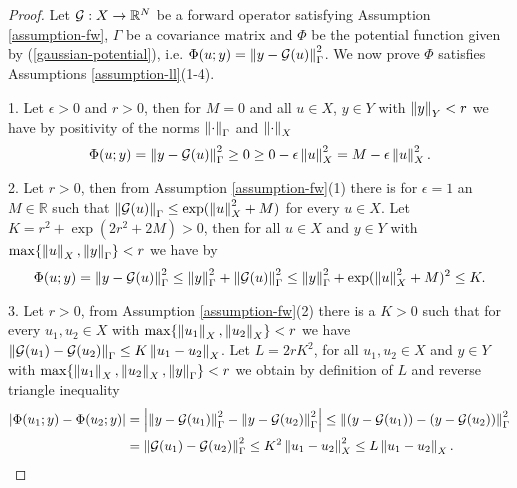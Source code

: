\begin{proof}
  Let $\mathcal{G} : X \rightarrow \mathbb{R}^N$ be a forward operator satisfying Assumption \ref{assumption-fw}, $\Gamma$ be a covariance matrix and $\Phi$ be the potential function given by (\ref{gaussian-potential}), i.e. $\Phi(u; y) = \left\lVert y - \mathcal{G}(u)\right\rVert_\Gamma^2$. We now prove $\Phi$ satisfies Assumptions \ref{assumption-ll}(1-4).

  1. Let $\epsilon > 0$ and $r > 0$, then for $M = 0$ and all $u \in X$, $y \in Y$ with $\left\lVert y\right\rVert_Y < r$ we have by positivity of the norms $\left\lVert\cdot\right\rVert_\Gamma$ and $\left\lVert\cdot\right\rVert_X$
  \begin{equation*}
    \Phi(u; y) = \left\lVert y - \mathcal{G}(u)\right\rVert_\Gamma^2 \ge 0 \ge 0 - \epsilon\left\lVert u\right\rVert_X^2 = M - \epsilon\left\lVert u\right\rVert_X^2.
  \end{equation*}

  2. Let $r > 0$, then from Assumption \ref{assumption-fw}(1) there is for $\epsilon = 1$ an $M \in \mathbb{R}$ such that $\left\lVert\mathcal{G}(u)\right\rVert_\Gamma \le \exp(\left\lVert u\right\rVert_X^2 + M)$ for every $u \in X$. Let $K = r^2 + \exp(2r^2 + 2M) > 0$, then for all $u \in X$ and $y \in Y$ with $\max\{\left\lVert u\right\rVert_X, \left\lVert y\right\rVert_\Gamma\} < r$ we have by
  \begin{equation*}
    \Phi(u; y) = \left\lVert y - \mathcal{G}(u)\right\rVert_\Gamma^2 \le \left\lVert y\right\rVert_\Gamma^2 + \left\lVert\mathcal{G}(u)\right\rVert_\Gamma^2 \le \left\lVert y\right\rVert_\Gamma^2 + \exp(\left\lVert u\right\rVert_X^2 + M)^2 \le  K.
  \end{equation*}

  3. Let $r > 0$, from Assumption \ref{assumption-fw}(2) there is a $K > 0$ such that for every $u_1, u_2 \in X$ with $\max\{\left\lVert u_1\right\rVert_X, \left\lVert u_2\right\rVert_X\} < r$ we have $\left\lVert\mathcal{G}(u_1) - \mathcal{G}(u_2)\right\rVert_\Gamma \le K\left\lVert u_1 - u_2\right\rVert_X$. Let $L = 2rK^2$, for all $u_1, u_2 \in X$ and $y \in Y$ with $\max\{\left\lVert u_1\right\rVert_X, \left\lVert u_2\right\rVert_X,\left\lVert y\right\rVert_\Gamma\} < r$ we obtain by definition of $L$ and reverse triangle inequality
  \begin{align*}
    |\Phi(u_1; y) - \Phi(u_2; y)|
    &= \left|\left\lVert y - \mathcal{G}(u_1)\right\rVert_\Gamma^2 - \left\lVert y - \mathcal{G}(u_2)\right\rVert_\Gamma^2\right|
    \le \left\lVert (y - \mathcal{G}(u_1)) - (y - \mathcal{G}(u_2))\right\rVert_\Gamma^2\\
    &= \left\lVert\mathcal{G}(u_1) - \mathcal{G}(u_2)\right\rVert_\Gamma^2 \le K^2\left\lVert u_1 - u_2\right\rVert_X^2 \le L\left\lVert u_1 - u_2\right\rVert_X.
  \end{align*}


\end{proof}
